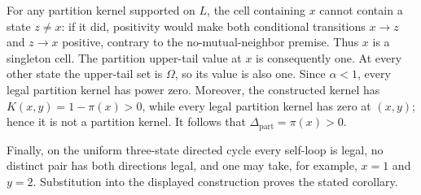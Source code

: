 For any partition kernel supported on \(L\), the cell containing \(x\) cannot contain a state \(z\neq x\): if it did, positivity would make both conditional transitions \(x\to z\) and \(z\to x\) positive, contrary to the no-mutual-neighbor premise.  Thus \(x\) is a singleton cell.  The partition upper-tail value at \(x\) is consequently one.  At every other state the upper-tail set is \(\Omega\), so its value is also one.  Since \(\alpha<1\), every legal partition kernel has power zero.  Moreover, the constructed kernel has \(K(x,y)=1-\pi(x)>0\), while every legal partition kernel has zero at \((x,y)\); hence it is not a partition kernel.  It follows that \(\Delta_{\mathrm{part}}=\pi(x)>0\).

Finally, on the uniform three-state directed cycle every self-loop is legal, no distinct pair has both directions legal, and one may take, for example, \(x=1\) and \(y=2\).  Substitution into the displayed construction proves the stated corollary.
